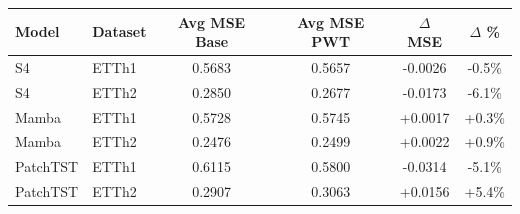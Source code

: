 \begin{tabular}{llcccc}
\toprule
\textbf{Model} & \textbf{Dataset} & \textbf{Avg MSE Base} & \textbf{Avg MSE PWT} & \textbf{$\Delta$ MSE} & \textbf{$\Delta$ \%} \\
\midrule
S4 & ETTh1 & 0.5683 & 0.5657 & -0.0026 & -0.5\% \\
S4 & ETTh2 & 0.2850 & 0.2677 & -0.0173 & -6.1\% \\
Mamba & ETTh1 & 0.5728 & 0.5745 & +0.0017 & +0.3\% \\
Mamba & ETTh2 & 0.2476 & 0.2499 & +0.0022 & +0.9\% \\
PatchTST & ETTh1 & 0.6115 & 0.5800 & -0.0314 & -5.1\% \\
PatchTST & ETTh2 & 0.2907 & 0.3063 & +0.0156 & +5.4\% \\
\bottomrule
\end{tabular}